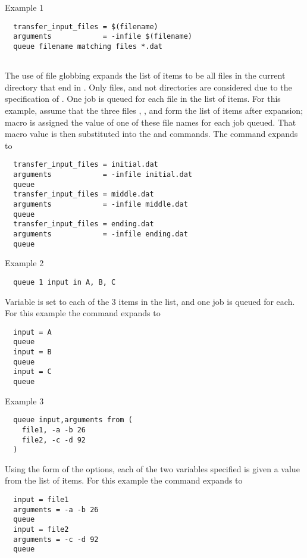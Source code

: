 \begin{description}
\item[Example 1]
\end{description}
\begin{verbatim}
  transfer_input_files = $(filename)
  arguments            = -infile $(filename)
  queue filename matching files *.dat
    
\end{verbatim}
The use of file globbing expands the list of items to be all files
in the current directory that end in .
Only files, and not directories are considered due to the
specification of .
One job is queued for each file in the list of items.
For this example,
assume that the three files ,
, and  form the list of items 
after expansion;
macro  is assigned the value of one of these file names
for each job queued.
That macro value is then substituted into the  and
 commands.
The  command expands to

\begin{verbatim}
  transfer_input_files = initial.dat
  arguments            = -infile initial.dat
  queue 
  transfer_input_files = middle.dat
  arguments            = -infile middle.dat
  queue 
  transfer_input_files = ending.dat
  arguments            = -infile ending.dat
  queue 
\end{verbatim}

\begin{description}
\item[Example 2]
\end{description}
\begin{verbatim}
  queue 1 input in A, B, C
\end{verbatim}
Variable  is set to each of the 3 items in the list,
and one job is queued for each.
For this example the  command expands to
\begin{verbatim}
  input = A
  queue 
  input = B
  queue 
  input = C
  queue 
\end{verbatim}

\begin{description}
\item[Example 3]
\end{description}
\begin{verbatim}
  queue input,arguments from (
    file1, -a -b 26
    file2, -c -d 92
  )
\end{verbatim}
Using the  form of the options,
each of the two variables specified is given a value from the list of items.
For this example the  command expands to
\begin{verbatim}
  input = file1
  arguments = -a -b 26
  queue 
  input = file2
  arguments = -c -d 92
  queue 
\end{verbatim}

